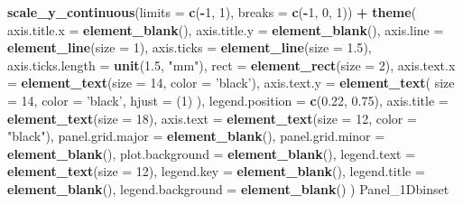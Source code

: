 \documentclass[
]{krantz}
\makeatletter
\newenvironment{Shaded}{\begin{snugshade}}{\end{snugshade}}
\newcommand{\DataTypeTok}[1]{\textcolor[rgb]{0.13,0.29,0.53}{#1}}
\newcommand{\DecValTok}[1]{\textcolor[rgb]{0.00,0.00,0.81}{#1}}
\newcommand{\FloatTok}[1]{\textcolor[rgb]{0.00,0.00,0.81}{#1}}
\newcommand{\KeywordTok}[1]{\textcolor[rgb]{0.13,0.29,0.53}{\textbf{#1}}}
\newcommand{\NormalTok}[1]{#1}
\newcommand{\OperatorTok}[1]{\textcolor[rgb]{0.81,0.36,0.00}{\textbf{#1}}}
\newcommand{\StringTok}[1]{\textcolor[rgb]{0.31,0.60,0.02}{#1}}
\newenvironment{kframe}{%
\medskip{}
\setlength{\fboxsep}{.8em}
 \def\at@end@of@kframe{}%
 \ifinner\ifhmode%
  \def\at@end@of@kframe{\end{minipage}}%
  \begin{minipage}{\columnwidth}%
 \fi\fi%
 \def\FrameCommand##1{\hskip\@totalleftmargin \hskip-\fboxsep
 \colorbox{shadecolor}{##1}\hskip-\fboxsep
     \hskip-\linewidth \hskip-\@totalleftmargin \hskip\columnwidth}%
 \MakeFramed {\advance\hsize-\width
   \@totalleftmargin\z@ \linewidth\hsize
   \@setminipage}}%
 {\par\unskip\endMakeFramed%
 \at@end@of@kframe}
\renewenvironment{Shaded}{\begin{kframe}}{\end{kframe}}
\makeatother
\begin{document}
\begin{Shaded}
\begin{Highlighting}[]
\StringTok{  }\KeywordTok{scale_y_continuous}\NormalTok{(}\DataTypeTok{limits =} \KeywordTok{c}\NormalTok{(}\OperatorTok{-}\DecValTok{1}\NormalTok{, }\DecValTok{1}\NormalTok{), }\DataTypeTok{breaks =} \KeywordTok{c}\NormalTok{(}\OperatorTok{-}\DecValTok{1}\NormalTok{, }\DecValTok{0}\NormalTok{, }\DecValTok{1}\NormalTok{)) }\OperatorTok{+}
\StringTok{  }\KeywordTok{theme}\NormalTok{(}
    \DataTypeTok{axis.title.x =} \KeywordTok{element_blank}\NormalTok{(),}
    \DataTypeTok{axis.title.y =} \KeywordTok{element_blank}\NormalTok{(),}
    \DataTypeTok{axis.line =} \KeywordTok{element_line}\NormalTok{(}\DataTypeTok{size =} \DecValTok{1}\NormalTok{),}
    \DataTypeTok{axis.ticks =} \KeywordTok{element_line}\NormalTok{(}\DataTypeTok{size =} \FloatTok{1.5}\NormalTok{),}
    \DataTypeTok{axis.ticks.length =} \KeywordTok{unit}\NormalTok{(}\FloatTok{1.5}\NormalTok{, }\StringTok{"mm"}\NormalTok{),}
    \DataTypeTok{rect =} \KeywordTok{element_rect}\NormalTok{(}\DataTypeTok{size =} \DecValTok{2}\NormalTok{),}
    \DataTypeTok{axis.text.x =} \KeywordTok{element_text}\NormalTok{(}\DataTypeTok{size =} \DecValTok{14}\NormalTok{, }\DataTypeTok{color =} \StringTok{'black'}\NormalTok{),}
    \DataTypeTok{axis.text.y =}
      \KeywordTok{element_text}\NormalTok{(}
        \DataTypeTok{size =} \DecValTok{14}\NormalTok{,}
        \DataTypeTok{color =} \StringTok{'black'}\NormalTok{,}
        \DataTypeTok{hjust =}\NormalTok{ (}\DecValTok{1}\NormalTok{)}
\NormalTok{      ),}
    \DataTypeTok{legend.position =} \KeywordTok{c}\NormalTok{(}\FloatTok{0.22}\NormalTok{, }\FloatTok{0.75}\NormalTok{),}
    \DataTypeTok{axis.title =} \KeywordTok{element_text}\NormalTok{(}\DataTypeTok{size =} \DecValTok{18}\NormalTok{),}
    \DataTypeTok{axis.text =} \KeywordTok{element_text}\NormalTok{(}\DataTypeTok{size =} \DecValTok{12}\NormalTok{, }\DataTypeTok{color =} \StringTok{"black"}\NormalTok{),}
    \DataTypeTok{panel.grid.major =} \KeywordTok{element_blank}\NormalTok{(),}
    \DataTypeTok{panel.grid.minor =} \KeywordTok{element_blank}\NormalTok{(),}
    \DataTypeTok{plot.background =} \KeywordTok{element_blank}\NormalTok{(),}
    \DataTypeTok{legend.text =} \KeywordTok{element_text}\NormalTok{(}\DataTypeTok{size =} \DecValTok{12}\NormalTok{),}
    \DataTypeTok{legend.key =} \KeywordTok{element_blank}\NormalTok{(),}
    \DataTypeTok{legend.title =} \KeywordTok{element_blank}\NormalTok{(),}
    \DataTypeTok{legend.background =} \KeywordTok{element_blank}\NormalTok{()}
\NormalTok{  )}
\NormalTok{Panel_1Dbinset}
\end{Highlighting}
\end{Shaded}
\end{document}

